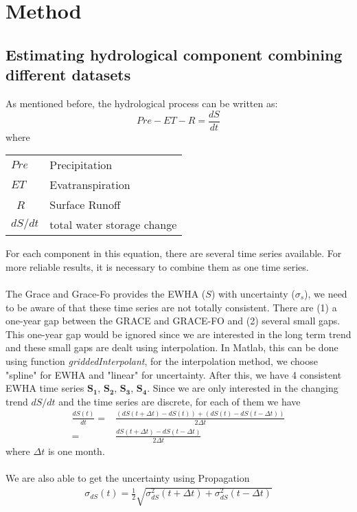 \chapter{Method}
\section{Estimating hydrological component combining different datasets}\label{section:combine}
As mentioned before, the hydrological process can be written as:
\begin{equation}
Pre - ET - R = \frac{dS}{dt}
\end{equation}
where
\begin{table}[htbp]
	\begin{tabular}{ll}
		$Pre$   & Precipitation    \\ 
		$ET$    & Evatranspiration \\ \
		$R$     & Surface Runoff \\ 
		$dS / dt$ & total water storage change \\ 
	\end{tabular}
\end{table}
For each component in this equation, there are several time series available. For more reliable results, it is necessary to combine them as one time series.\\\\
The Grace and Grace-Fo provides the EWHA ($S$) with uncertainty ($\sigma_s$), we need to be aware of that these time series are not totally consistent. There are (1) a one-year gap between the GRACE and GRACE-FO and (2) several small gaps. This one-year gap would be ignored since we are interested in the long term trend and these small gaps are dealt using interpolation. In Matlab, this can be done using function \textit{griddedInterpolant}, for the interpolation method, we choose "spline" for EWHA and "linear" for uncertainty. After this, we have 4 consistent EWHA time series $\bm{S_1}$, $\bm{S_2}$, $\bm{S_3}$, $\bm{S_4}$. Since we are only interested in the changing trend $dS / dt$ and the time series are discrete, for each of them we have
\begin{align}\label{eq:dsdt}
\frac{dS(t)}{dt} = &\frac{(dS(t+\Delta t) - dS(t)) + (dS(t) - dS(t-\Delta t))}{2 \Delta t}\\
= & \frac{dS(t+\Delta t) - dS(t-\Delta t)}{2 \Delta t}
\end{align}
where $\Delta t$ is one month. \\\\
We are also able to get the uncertainty using Propagation
\begin{align}
\sigma_{dS}(t) = \frac{1}{2} \sqrt{\sigma_{dS}^2(t + \Delta t) + \sigma_{dS}^2(t - \Delta t)}
\end{align}
